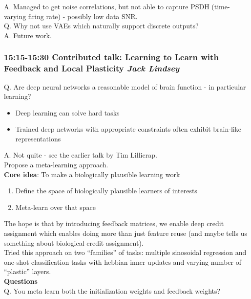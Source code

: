 \documentclass[12pt]{article}
\begin{document}
A. Managed to get noise correlations, but not able to capture PSDH (time-varying firing rate) - possibly low data SNR. \\

Q. Why not use VAEs which naturally support discrete outputs? \\

A. Future work.


\subsubsection{15:15-15:30 Contributed talk: Learning to Learn with Feedback and Local Plasticity \textit{Jack Lindsey}}

Q. Are deep neural networks a reasonable model of brain function - in particular learning?
\begin{itemize}
    \item Deep learning can solve hard tasks
    \item Trained deep networks with appropriate constraints often exhibit brain-like representations
\end{itemize}
A. Not quite - see the earlier talk by Tim Lillicrap. \\

Propose a meta-learning approach. \\

\textbf{Core idea}: To make a biologically plausible learning work 
\begin{enumerate}
    \item Define the space of biologically plausible learners of interests
    \item Meta-learn over that space
\end{enumerate}
The hope is that by introducing feedback matrices, we enable deep credit assignment which enables doing more than just feature reuse (and maybe tells us something about biological credit assignment). \\

Tried this approach on two ``families'' of tasks: multiple sinosoidal regression and one-shot classification tasks with hebbian inner updates and varying number of ``plastic'' layers. \\

\textbf{Questions} \\ 

Q. You meta learn both the initialization weights and feedback weights? \\
\end{document}
